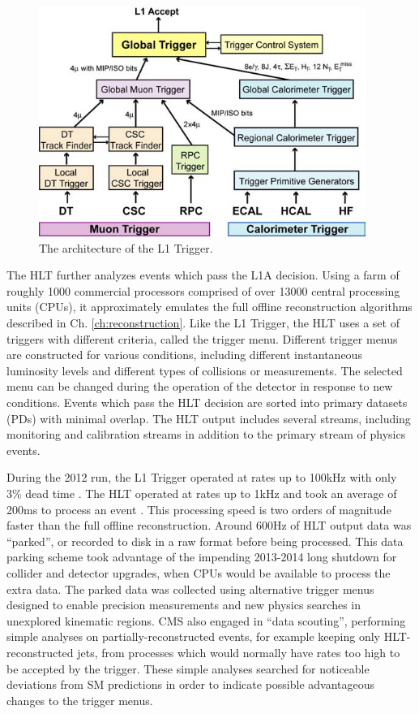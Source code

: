 \documentclass[12pt]{thesis}  %
\begin{document}
\begin{figure}[hbt]
\begin{center}
\includegraphics[width=0.95\textwidth]{figures/L1_architecture.png}
\caption{The architecture of the L1 Trigger.}
\label{fig:L1-trigger}
\end{center}
\end{figure}

The HLT further analyzes events which pass the L1A decision. Using a farm of roughly 1000 commercial processors comprised of over 13000 central processing units (CPUs), it approximately emulates the full offline reconstruction algorithms described in Ch. \ref{ch:reconstruction}. Like the L1 Trigger, the HLT uses a set of triggers with different criteria, called the trigger menu. Different trigger menus are constructed for various conditions, including different instantaneous luminosity levels and different types of collisions or measurements. The selected menu can be changed during the operation of the detector in response to new conditions. Events which pass the HLT decision are sorted into primary datasets (PDs) with minimal overlap. The HLT output includes several streams, including monitoring and calibration streams in addition to the primary stream of physics events.

During the 2012 run, the L1 Trigger operated at rates up to 100\unit{kHz} with only 3\% dead time \cite{Brooke:2013hnf}. The HLT operated at rates up to 1\unit{kHz} and took an average of 200\unit{ms} to process an event \cite{Trocino:2014jya}. This processing speed is two orders of magnitude faster than the full offline reconstruction. Around 600\unit{Hz} of HLT output data was ``parked'', or recorded to disk in a raw format before being processed. This data parking scheme took advantage of the impending 2013-2014 long shutdown for collider and detector upgrades, when CPUs would be available to process the extra data. The parked data was collected using alternative trigger menus designed to enable precision measurements and new physics searches in unexplored kinematic regions. CMS also engaged in ``data scouting'', performing simple analyses on partially-reconstructed events, for example keeping only HLT-reconstructed jets, from processes which would normally have rates too high to be accepted by the trigger. These simple analyses searched for noticeable deviations from SM predictions in order to indicate possible advantageous changes to the trigger menus.
\end{document}
